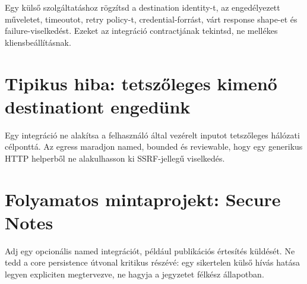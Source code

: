Egy külső szolgáltatáshoz rögzítsd a destination identity-t, az engedélyezett műveletet, timeoutot, retry policy-t, credential-forrást, várt response shape-et és failure-viselkedést. Ezeket az integráció contractjának tekintsd, ne mellékes kliensbeállításnak.

\section{Tipikus hiba: tetszőleges kimenő destinationt engedünk}
Egy integráció ne alakítsa a felhasználó által vezérelt inputot tetszőleges hálózati célponttá. Az egress maradjon named, bounded és reviewable, hogy egy generikus HTTP helperből ne alakulhasson ki SSRF-jellegű viselkedés.

\section{Folyamatos mintaprojekt: Secure Notes}
Adj egy opcionális named integrációt, például publikációs értesítés küldését. Ne tedd a core persistence útvonal kritikus részévé: egy sikertelen külső hívás hatása legyen expliciten megtervezve, ne hagyja a jegyzetet félkész állapotban.

